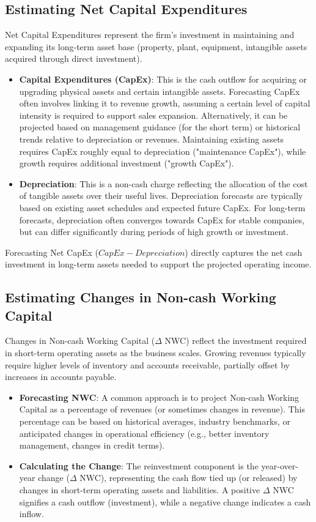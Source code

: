 \subsection{Estimating Net Capital Expenditures} \label{sec:net_capex_estimation}
Net Capital Expenditures represent the firm's investment in maintaining and expanding its long-term asset base (property, plant, equipment, intangible assets acquired through direct investment).
\begin{itemize}
    \item \textbf{Capital Expenditures (CapEx)}: This is the cash outflow for acquiring or upgrading physical assets and certain intangible assets. Forecasting CapEx often involves linking it to revenue growth, assuming a certain level of capital intensity is required to support sales expansion. Alternatively, it can be projected based on management guidance (for the short term) or historical trends relative to depreciation or revenues. Maintaining existing assets requires CapEx roughly equal to depreciation ("maintenance CapEx"), while growth requires additional investment ("growth CapEx").
    \item \textbf{Depreciation}: This is a non-cash charge reflecting the allocation of the cost of tangible assets over their useful lives. Depreciation forecasts are typically based on existing asset schedules and expected future CapEx. For long-term forecasts, depreciation often converges towards CapEx for stable companies, but can differ significantly during periods of high growth or investment.
\end{itemize}
Forecasting Net CapEx (\(CapEx - Depreciation\)) directly captures the net cash investment in long-term assets needed to support the projected operating income.

\subsection{Estimating Changes in Non-cash Working Capital} \label{sec:nwc_estimation}
Changes in Non-cash Working Capital (\(\Delta\) NWC) reflect the investment required in short-term operating assets as the business scales. Growing revenues typically require higher levels of inventory and accounts receivable, partially offset by increases in accounts payable.
\begin{itemize}
    \item \textbf{Forecasting NWC}: A common approach is to project Non-cash Working Capital as a percentage of revenues (or sometimes changes in revenue). This percentage can be based on historical averages, industry benchmarks, or anticipated changes in operational efficiency (e.g., better inventory management, changes in credit terms).
    \item \textbf{Calculating the Change}: The reinvestment component is the year-over-year change (\(\Delta\) NWC), representing the cash flow tied up (or released) by changes in short-term operating assets and liabilities. A positive \(\Delta\) NWC signifies a cash outflow (investment), while a negative change indicates a cash inflow.
\end{itemize}

